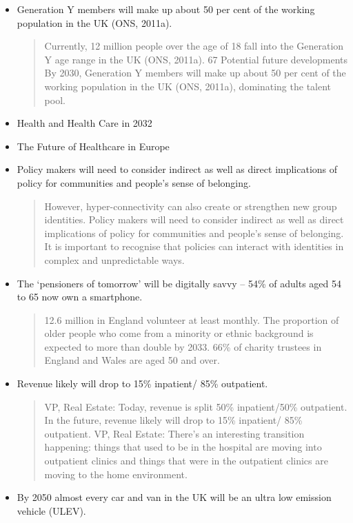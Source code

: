 \begin{itemize}
	\item Generation Y members will make up about 50 per cent of the working population in the UK (ONS, 2011a).
	\begin{quotation}
		Currently, 12 million people over the age of 18 fall into the Generation Y age range in the UK (ONS, 2011a). 67 Potential future developments By 2030, Generation Y members will make up about 50 per cent of the working population in the UK (ONS, 2011a), dominating the talent pool.\end{quotation}
	\item Health and Health Care in 2032
	\item The Future of Healthcare  in Europe
	\item Policy makers will need to consider indirect as well as direct implications of policy for communities and people's sense of belonging.
	\begin{quotation}
		However, hyper-connectivity can also create or strengthen new group identities. Policy makers will need to consider indirect as well as direct implications of policy for communities and people's sense of belonging. It is important to recognise that policies can interact with identities in complex and unpredictable ways.\end{quotation}
	\item The `pensioners of tomorrow' will be digitally savvy -- 54\% of adults aged 54 to 65 now own a smartphone.
	\begin{quotation}
		12.6 million in England volunteer at least monthly. The proportion of older people who come from a minority or ethnic background is expected to more than double by 2033. 66\% of charity trustees in England and Wales are aged 50 and over.\end{quotation}
	\item Revenue likely will drop to 15\% inpatient/ 85\% outpatient.
	\begin{quotation}
		VP, Real Estate: Today, revenue is split 50\% inpatient/50\% outpatient. In the future, revenue likely will drop to 15\% inpatient/ 85\% outpatient. VP, Real Estate: There's an interesting transition happening: things that used to be in the hospital are moving into outpatient clinics and things that were in the outpatient clinics are moving to the home environment.\end{quotation}
	\item By 2050 almost every car and van in the UK will be an ultra low emission vehicle (ULEV).
	\begin{quotation}

\end{quotation}
\end{itemize}
